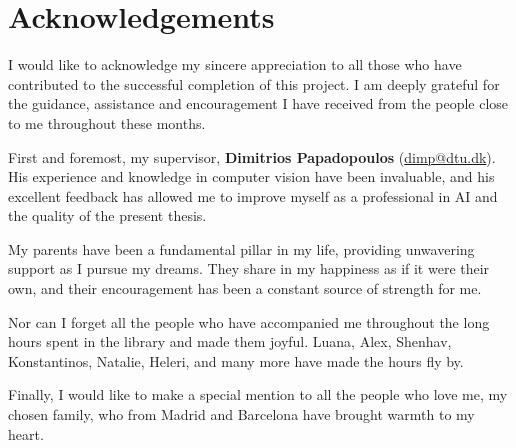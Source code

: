 \section*{Acknowledgements}

I would like to acknowledge my sincere appreciation to all those who have contributed to the successful completion of this project. I am deeply grateful for the guidance, assistance and encouragement I have received from the people close to me throughout these months.

First and foremost, my supervisor, \textbf{Dimitrios Papadopoulos} (\href{mailto:dimp@dtu.dk}{dimp@dtu.dk}). His experience and knowledge in computer vision have been invaluable, and his excellent feedback has allowed me to improve myself as a professional in AI and the quality of the present thesis.

My parents have been a fundamental pillar in my life, providing unwavering support as I pursue my dreams. They share in my happiness as if it were their own, and their encouragement has been a constant source of strength for me.

Nor can I forget all the people who have accompanied me throughout the long hours spent in the library and made them joyful. Luana, Alex, Shenhav, Konstantinos, Natalie, Heleri, and many more have made the hours fly by.

Finally, I would like to make a special mention to all the people who love me, my chosen family, who from Madrid and Barcelona have brought warmth to my heart.